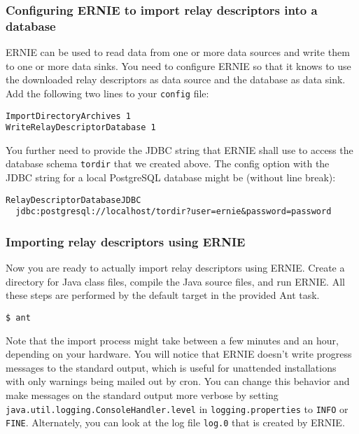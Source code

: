 \documentclass{article}
\begin{document}
\subsubsection{Configuring ERNIE to import relay descriptors into a
database}

ERNIE can be used to read data from one or more data sources and write
them to one or more data sinks.
You need to configure ERNIE so that it knows to use the downloaded relay
descriptors as data source and the database as data sink.
Add the following two lines to your \verb+config+ file:

\begin{verbatim}
ImportDirectoryArchives 1
WriteRelayDescriptorDatabase 1
\end{verbatim}

You further need to provide the JDBC string that ERNIE shall use to access
the database schema \verb+tordir+ that we created above.
The config option with the JDBC string for a local PostgreSQL database
might be (without line break):

\begin{verbatim}
RelayDescriptorDatabaseJDBC
  jdbc:postgresql://localhost/tordir?user=ernie&password=password
\end{verbatim}

\subsubsection{Importing relay descriptors using ERNIE}

Now you are ready to actually import relay descriptors using ERNIE.
Create a directory for Java class files, compile the Java source files,
and run ERNIE. All these steps are performed by the default target in the
provided Ant task.

\begin{verbatim}
$ ant
\end{verbatim}

Note that the import process might take between a few minutes and an hour,
depending on your hardware.
You will notice that ERNIE doesn't write progress messages to the standard
output, which is useful for unattended installations with only warnings
being mailed out by cron.
You can change this behavior and make messages on the standard output more
verbose by setting
\verb+java.util.logging.ConsoleHandler.level+ in
\verb+logging.properties+ to \verb+INFO+ or \verb+FINE+.
Alternately, you can look at the log file \verb+log.0+ that is created by
ERNIE.
\end{document}
